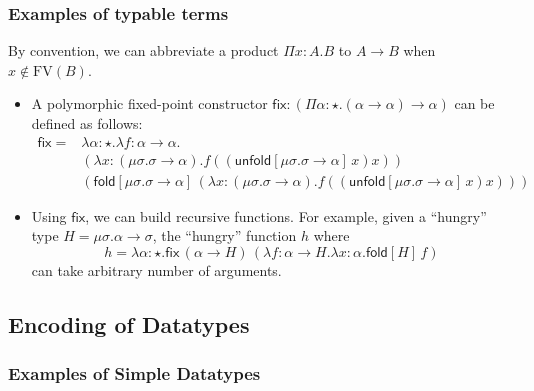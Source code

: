\documentclass[oneside,a4paper]{article}
\theoremstyle{break}
\newcommand{\fold}[2]{\mathsf{fold}[#1]\,#2}
\newcommand{\unfold}[2]{\mathsf{unfold}[#1]\,#2}
\begin{document}
\subsubsection{Examples of typable terms}

By convention, we can abbreviate a product $\Pi x:A.B$ to $A \to B$
when $x \not \in \mathrm{FV}(B)$.

\begin{itemize}
  \newcommand{\FPTypeU}{\mu\sigma . \sigma \to \alpha}
  \newcommand{\FPTermfxx}{\lambda
    x:(\FPTypeU).f((\unfold{\FPTypeU}{x})x)}
  \newcommand{\FP}{\mathsf{fix}} %
\item A polymorphic fixed-point constructor
  $\FP:(\Pi \alpha:\star.(\alpha \to \alpha) \to \alpha)$ can be
  defined as follows:
\begin{align*}
  \FP=&\lambda \alpha:\star . \lambda f:\alpha \to \alpha.\\
      &(\FPTermfxx)\\
      &(\fold{\FPTypeU}{(\FPTermfxx)})
\end{align*}
\newcommand{\HGType}{\mu\sigma. \alpha \to \sigma}%
\item Using $\FP$, we can build recursive functions. For example,
  given a ``hungry'' type $H=\HGType$, the ``hungry'' function $h$
  where
  \[h=\lambda \alpha:\star.\FP\,(\alpha \to H)\,(\lambda f:\alpha \to
  H.\lambda x:\alpha.\fold{H}{f})\]
  can take arbitrary number of arguments.
\end{itemize}

\subsection{Encoding of Datatypes}
\newcommand{\Nat}{\mathsf{Nat}} \newcommand{\zero}{\mathsf{zero}}
\newcommand{\suc}{\mathsf{suc}} \newcommand{\plus}{\mathsf{plus}}
\newcommand{\List}{\mathsf{List}} \newcommand{\nil}{\mathsf{nil}}
\newcommand{\cons}{\mathsf{cons}}
\newcommand{\length}{\mathsf{length}}
\newcommand{\PlFunc}{\Nat\rightarrow\Nat\rightarrow\Nat}
\newcommand{\case}{\mathsf{case}} \newcommand{\of}{\mathsf{of}}

\subsubsection{Examples of Simple Datatypes}
\end{document}
